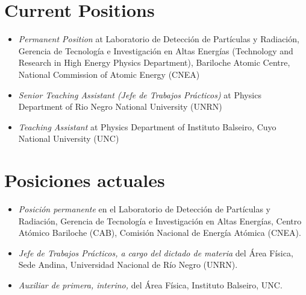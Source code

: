 \ifeng
\section*{Current Positions}
\begin{itemize}
\item \emph{Permanent Position} at Laboratorio de Detección de Partículas y Radiación, Gerencia de Tecnología e Investigación en Altas Energías (Technology and Research in High Energy Physics Department), Bariloche Atomic Centre, National Commission of Atomic Energy (CNEA)
\item \emph{Senior Teaching Assistant (Jefe de Trabajos Prácticos)} at Physics Department of Rio Negro National University (UNRN)
\item \emph{Teaching Assistant} at Physics Department of Instituto Balseiro, Cuyo National University (UNC)
\end{itemize}
\else
\section*{Posiciones actuales}
\begin{itemize}
\item \emph{Posición permanente} en el Laboratorio de Detección de Partículas y Radiación, Gerencia de Tecnología e Investigación en Altas Energías, Centro Atómico Bariloche (CAB), Comisión Nacional de Energía Atómica (CNEA).\\
\item \emph{Jefe de Trabajos Prácticos, a cargo del dictado de materia} del Área Física, Sede Andina, Universidad Nacional de Río Negro (UNRN).\\
\item \emph{Auxiliar de primera, interino,} del Área Física, Instituto Balseiro, UNC.\\
\end{itemize}
\fi

\ifeng
